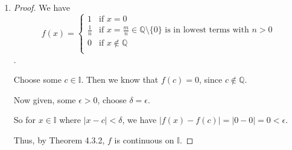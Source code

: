 \documentclass[12pt,letterpaper]{article}
\begin{document}
\begin{enumerate}[label=Exercise 4.3.\arabic*]
\begin{enumerate}
\begin{proof}
            Choose some rational number $c$ in lowest terms $\frac{m}{n}$.

            Now construct any sequence $(x_n)$ from $\mathbb{I}$ such that,
            $(x_n) \to c$.

            So, $f(x_n) \to 0$, but $f(c) = \frac{1}{n}$.

            Now, since $f : \mathbb{R} \to \mathbb{R}$,
            $c$ is a limit point in $\mathbb{R}$,
            $(x_n) \to c$,
            but $f(x_n) \neq f(c)$,
            we conclude that Thomae's function is not continuous at any rational point.
          \end{proof}
        \item
          \begin{proof}
            We have
            \[
              f(x) =
              \begin{cases}
                1           & \text{if } x = 0 \\
                \frac{1}{n} & \text{if } x = \frac{m}{n} \in \mathbb{Q} \setminus \{0\} \text{ is in lowest terms with } n > 0 \\
                0           & \text{if } x \notin \mathbb{Q} \\
              \end{cases}
            \].

            Choose some $c \in \mathbb{I}$.
            Then we know that $f(c) = 0$, since $c \notin \mathbb{Q}$.

            Now given, some $\epsilon > 0$, choose $\delta = \epsilon$.

            So for $x \in \mathbb{I}$ where $|x - c| < \delta$,
            we have $|f(x) - f(c)| = |0 - 0| = 0 < \epsilon$.

            Thus, by Theorem 4.3.2, $f$ is continuous on $\mathbb{I}$.
          \end{proof}
      \end{enumerate}

  \end{enumerate}
\end{document}
